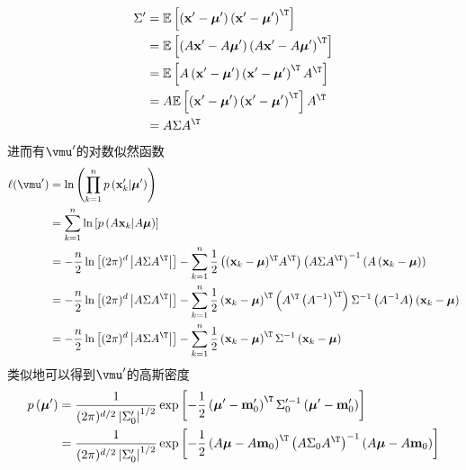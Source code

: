 \documentclass[reportComp]{thesis}
\begin{document}
\begin{answer}
\begin{itemize}
\[\begin{aligned}
	\Sigma^{\prime} &=\mathbb{E}\left[\left(\mathbf{x}^{\prime}-\boldsymbol{\mu}^{\prime}\right)\left(\mathbf{x}^{\prime}-\boldsymbol{\mu}^{\prime}\right)^{\T}\right] \\
	&=\mathbb{E}\left[\left(A \mathbf{x}^{\prime}-A \boldsymbol{\mu}^{\prime}\right)\left(A \mathbf{x}^{\prime}-A \boldsymbol{\mu}^{\prime}\right)^{\T}\right] \\
	&=\mathbb{E}\left[A\left(\mathbf{x}^{\prime}-\boldsymbol{\mu}^{\prime}\right)\left(\mathbf{x}^{\prime}-\boldsymbol{\mu}^{\prime}\right)^{\T} A^{\T}\right] \\
	&=A \mathbb{E}\left[(\mathbf{x}^{\prime}-\boldsymbol{\mu}^{\prime})\left(\mathbf{x}^{\prime}-\boldsymbol{\mu}^{\prime}\right)^{\T}\right] A^{\T} \\
	&=A \Sigma A^{\T}
	\end{aligned}\]
	进而有$\vmu'$的对数似然函数
	\[\begin{aligned}
	\ell(\vmu')
	&=\ln \left(\prod_{k=1}^{n} p\left(\mathbf{x}_{k}^{\prime} | \boldsymbol{\mu}^{\prime}\right)\right) \\
	&=\sum_{k=1}^{n} \ln \left[p\left(A \mathbf{x}_{k} | A \boldsymbol{\mu}\right)\right] \\
	&=-\frac{n}{2} \ln \left[(2 \pi)^{d}\left|A \Sigma A^{\T}\right|\right]
	-\sum_{k=1}^{n} \frac{1}{2}\left((\mathbf{x}_k-\boldsymbol{\mu})^{\T} A^{\T}\right)
	\left(A \Sigma A^{\T}\right)^{-1}
	\left(A\left(\mathbf{x}_{k}-\boldsymbol{\mu}\right)\right) \\
	&=-\frac{n}{2} \ln \left[(2 \pi)^{d}\left|A \Sigma A^{\T}\right|\right]-\sum_{k=1}^{n} \frac{1}{2}\left(\mathbf{x}_{k}-\boldsymbol{\mu}\right)^{\T}\left(A^{\T}\left(A^{-1}\right)^{\T}\right) \Sigma^{-1}\left(A^{-1} A\right)\left(\mathbf{x}_{k}-\boldsymbol{\mu}\right) \\
	&=-\frac{n}{2} \ln \left[(2 \pi)^{d}\left|A \Sigma A^{\T}\right|\right]-\sum_{k=1}^{n} \frac{1}{2}\left(\mathbf{x}_{k}-\boldsymbol{\mu}\right)^{\T} \Sigma^{-1}\left(\mathbf{x}_{k}-\boldsymbol{\mu}\right)
	\end{aligned}\]
	类似地可以得到$\vmu'$的高斯密度
	\[\begin{aligned}
	p\left(\boldsymbol{\mu}^{\prime}\right)
	&=\frac{1}{(2 \pi)^{d / 2}\left|\Sigma_{0}^{\prime}\right|^{1 / 2}} \exp \left[-\frac{1}{2}\left(\boldsymbol{\mu}^{\prime}-\mathbf{m}_{0}'\right)^{\T} \Sigma_{0}^{\prime -1}\left(\boldsymbol{\mu}^{\prime}-\mathbf{m}_{0}'\right)\right] \\
	&=\frac{1}{(2 \pi)^{d / 2}\left|\Sigma_{0}^{\prime}\right|^{1 / 2}} \exp \left[-\frac{1}{2}\left(A \boldsymbol{\mu}-A \mathbf{m}_{0}\right)^{\T}\left(A \Sigma_{0} A^{\T}\right)^{-1}\left(A \boldsymbol{\mu}-A \mathbf{m}_{0}\right)\right] \\

\end{aligned}\]
\end{itemize}
\end{answer}
\end{document}
